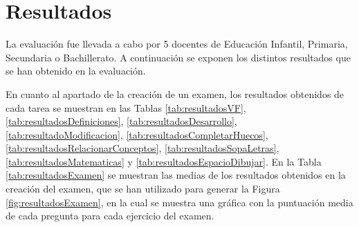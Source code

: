 \section{Resultados}\label{sec:resultadosEvaluacion}
La evaluación fue llevada a cabo por 5 docentes de Educación Infantil, Primaria, Secundaria o Bachillerato. A continuación se exponen los distintos resultados que se han obtenido en la evaluación.

En cuanto al apartado de la creación de un examen, los resultados obtenidos de cada tarea se muestran en las Tablas \ref{tab:resultadosVF}, \ref{tab:resultadosDefiniciones}, \ref{tab:resultadosDesarrollo}, \ref{tab:resultadoModificacion}, \ref{tab:resultadosCompletarHuecos}, \ref{tab:resultadosRelacionarConceptos}, \ref{tab:resultadosSopaLetras}, \ref{tab:resultadosMatematicas} y \ref{tab:resultadosEspacioDibujar}. En la Tabla \ref{tab:resultadosExamen} se muestran las medias de los resultados obtenidos en la creación del examen, que se han utilizado para generar la Figura \ref{fig:resultadosExamen}, en la cual se muestra una gráfica con la puntuación media de cada pregunta para cada ejercicio del examen.

